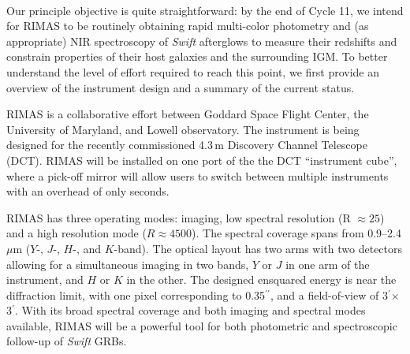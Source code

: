 \documentclass[letterpaper,11pt]{article}
\newcommand{\arcsec}{\mbox{$^{\prime\prime}$}}%
\newcommand{\arcmin}{\mbox{$^\prime$}}%
\begin{document}
\smallskip\\
Our principle objective is quite straightforward: by the end of Cycle 11, we intend
for RIMAS to be routinely obtaining rapid multi-color photometry and (as appropriate) 
NIR spectroscopy of \textit{Swift} afterglows to measure their redshifts and constrain 
properties of their host galaxies and the surrounding IGM.  To better understand the 
level of effort required to reach this point, we first provide an overview of the 
instrument design and a summary of the current status.

\smallskip

RIMAS is a collaborative effort between Goddard Space Flight Center, the University of
Maryland, and Lowell observatory.  The instrument is being designed for the recently
commissioned 4.3\,m Discovery Channel Telescope (DCT).  RIMAS will be installed on one 
port of the the DCT ``instrument cube'', where a pick-off mirror will allow users to
switch between multiple instruments with an overhead of only seconds.

RIMAS has three operating modes: imaging, low spectral resolution (R $\approx 25$) and
a high resolution mode ($R \approx 4500$). The spectral coverage spans from 
0.9--2.4\,$\mu$m ($Y$-, $J$-, $H$-, and $K$-band).  The optical layout has two arms 
with two detectors allowing for a simultaneous imaging in two bands, $Y$ or $J$ in 
one arm of the instrument, and $H$ or $K$ in the other.  The designed ensquared
energy is near the diffraction limit, with one pixel corresponding to 0.35\arcsec, 
and a field-of-view of 3\arcmin $\times$ 3\arcmin.  With its broad spectral coverage 
and both imaging and spectral modes available, RIMAS will be a powerful tool for 
both photometric and spectroscopic follow-up of \textit{Swift} GRBs.

\smallskip
\end{document}
